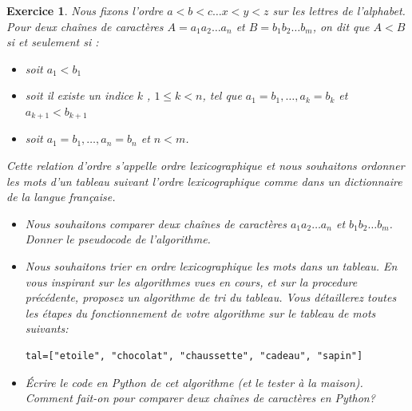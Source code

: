 \documentclass[11pt]{article}
\newtheorem{exercice}{Exercice}[section]
\begin{document}
\begin{exercice}
\item Nous fixons l'ordre $a<b< c  \ldots  x< y < z$ sur les lettres de l'alphabet. Pour deux chaînes de caractères  $A=a_1a_2\ldots a_n$ et $B=b_1b_2\ldots b_m$, on dit  que  $A < B$ si et seulement si :
\begin{itemize}
\item soit $a_1 < b_1$ 
\item soit il existe un indice $k$ , $1 \leq  k < n$, tel que $a_1 = b_1, \ldots,  a_k = b_k$  et $a_{k + 1} < b_{k + 1}$ 
\item soit  $a_1 = b_1, \ldots,  a_n = b_n$ et  $n<m$. 
\end{itemize}
Cette relation d'ordre s'appelle {ordre lexicographique}  et nous souhaitons ordonner les mots d'un tableau suivant l'ordre lexicographique comme dans un dictionnaire de la langue française. 
\begin{itemize}
\item[1.] Nous souhaitons comparer deux chaînes de caractères $a_1a_2\ldots a_n$ et  $b_1b_2\ldots b_m$. Donner le pseudocode de l'algorithme. 
\item[2.]  Nous souhaitons trier en ordre lexicographique les mots dans un tableau. En vous inspirant sur les algorithmes  vues en cours, et sur la procedure précédente,  proposez  un algorithme de tri du tableau. 
Vous détaillerez toutes les étapes du fonctionnement de votre algorithme sur le tableau de mots suivants: 

\vspace{0.5 cm}

\begin{verbatim}
tal=["etoile", "chocolat", "chaussette", "cadeau", "sapin"]
\end{verbatim}

\vspace{0.5 cm}

\item[3.]  \'Ecrire le code en Python de cet algorithme (et le tester à la maison).  Comment fait-on pour comparer deux chaînes de caractères en Python? 

\end{itemize}

\end{exercice}
\end{document}
